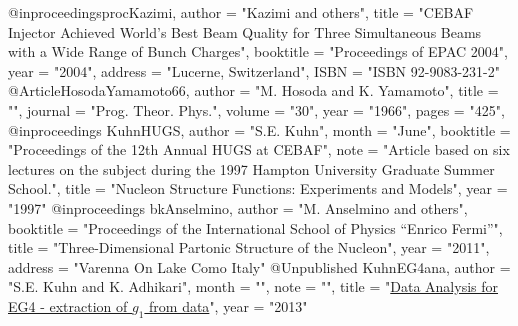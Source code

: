 @inproceedings{procKazimi,
    author    = "Kazimi and others",
    title     = "{CEBAF Injector Achieved World's Best Beam Quality for Three Simultaneous Beams with a Wide Range of Bunch Charges}",
	booktitle = "Proceedings of EPAC 2004", 
	year      = "2004",
	address   = "Lucerne, Switzerland",
	ISBN      = "ISBN 92-9083-231-2"
}
@Article{HosodaYamamoto66,
     author    = "M. Hosoda and K. Yamamoto",
     title     = "",
     journal   = "Prog. Theor. Phys.",
     volume    = "30",
     year      = "1966",
     pages     = "425",
}
@inproceedings{ KuhnHUGS,
	author = "S.E. Kuhn",
	month = "June",
	booktitle = "Proceedings of the 12th Annual HUGS at CEBAF", 
	note = "Article based on six lectures on the subject during the 1997 Hampton University Graduate Summer School.",
	title = "{Nucleon Structure Functions: Experiments and Models}",
	year = "1997"
}
@inproceedings{ bkAnselmino,
	author = "M. Anselmino and others",
	booktitle = "Proceedings of the International School of Physics ``Enrico Fermi''", 
	title = "{Three-Dimensional Partonic Structure of the Nucleon}",
	year = "2011",
	address = "Varenna On Lake Como Italy"
}
@Unpublished{ KuhnEG4ana,
	author = "S.E. Kuhn and K. Adhikari",
	month = "",
	note = "",
	title = "{\href{https://userweb.jlab.org/\~kuhn/EG4/EG4\_analysis.pdf}{Data Analysis for EG4 - extraction of $g_1$ from data}}",
	year = "2013"
}

